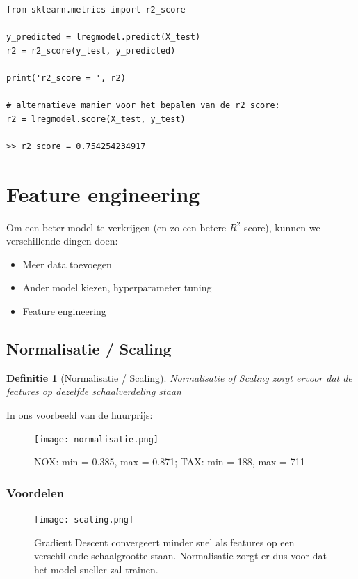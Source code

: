 \documentclass{article}
\newtheorem{theorem}{Definitie}[section]
\begin{document}
\begin{verbatim}
from sklearn.metrics import r2_score

y_predicted = lregmodel.predict(X_test)
r2 = r2_score(y_test, y_predicted)

print('r2_score = ', r2)

# alternatieve manier voor het bepalen van de r2 score:
r2 = lregmodel.score(X_test, y_test)

>> r2 score = 0.754254234917
\end{verbatim}

\section{Feature engineering}

Om een beter model te verkrijgen (en zo een betere $R^2$ score), kunnen we verschillende dingen doen:

\begin{itemize}
    \item Meer data toevoegen
    \item Ander model kiezen, hyperparameter tuning
    \item Feature engineering 
\end{itemize}

\subsection{Normalisatie / Scaling}

\begin{theorem}[Normalisatie / Scaling]
Normalisatie of Scaling zorgt ervoor dat de features op dezelfde schaalverdeling staan
\end{theorem}

In ons voorbeeld van de huurprijs:

\begin{figure}[H]
    \centering
    \texttt{[image: normalisatie.png]}
    \caption{NOX: min = 0.385, max = 0.871; TAX: min = 188, max = 711}
\end{figure}

\subsubsection{Voordelen}

\begin{figure}[H]
    \centering
    \texttt{[image: scaling.png]}
    \caption{Gradient Descent convergeert minder snel als features op een verschillende schaalgrootte staan. Normalisatie zorgt er dus voor dat het model sneller zal trainen.}
\end{figure}
\end{document}
